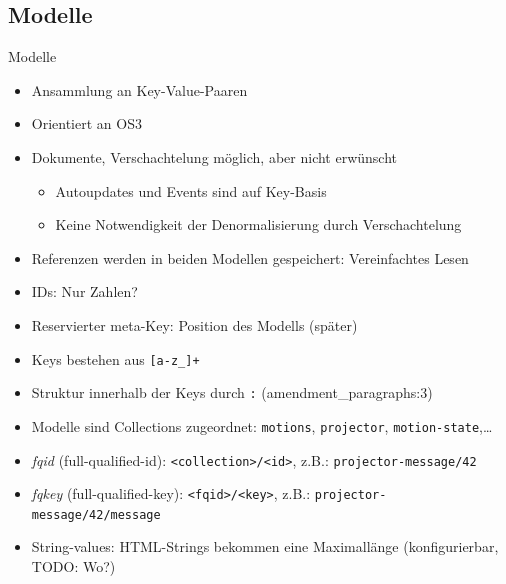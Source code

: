 \documentclass[10pt]{beamer}
\begin{document}
\subsection{Modelle}
\begin{frame}{Modelle}
	\begin{itemize}
		\item<+-> Ansammlung an Key-Value-Paaren
		\item<+-> Orientiert an OS3
		\item<+-> Dokumente, Verschachtelung möglich, aber nicht erwünscht
		\begin{itemize}
			\item Autoupdates und Events sind auf Key-Basis
			\item Keine Notwendigkeit der Denormalisierung durch Verschachtelung
		\end{itemize}
		\item<+-> Referenzen werden in beiden Modellen gespeichert: Vereinfachtes Lesen 
		\item<+-> IDs: Nur Zahlen?
		\item<+-> Reservierter meta-Key: Position des Modells (später)
		\item<+-> Keys bestehen aus \texttt{[a-z\_]+}
		\item<+-> Struktur innerhalb der Keys durch \texttt{:} (amendment\_paragraphs:3)
		\item<+-> Modelle sind Collections zugeordnet: \texttt{motions}, \texttt{projector}, \texttt{motion-state},\ldots
		\item<+-> \textit{fqid} (full-qualified-id): \texttt{<collection>/<id>}, z.B.: \texttt{projector-message/42}
		\item<+-> \textit{fqkey} (full-qualified-key): \texttt{<fqid>/<key>}, z.B.: \texttt{projector-message/42/message}
		\item<+-> String-values: HTML-Strings bekommen eine Maximallänge (konfigurierbar, TODO: Wo?)
	\end{itemize}
\end{frame}
\end{document}
